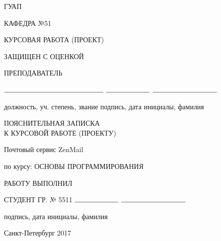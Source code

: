 \documentclass{article}
\begin{document}
    \begin{titlepage}
        \begin{center}
            ГУАП
            \vspace{0.25cm}

            КАФЕДРА №51
        \end{center}

        \begin{flushleft}

            КУРСОВАЯ РАБОТА (ПРОЕКТ)

            ЗАЩИЩЕН С ОЦЕНКОЙ

            ПРЕПОДАВАТЕЛЬ


            \vspace{0.5cm}

            $\rule{5cm}{0.15mm}$ \hfill $\rule{2.2cm}{0.15mm}$  \hfill $\rule{3.25cm}{0.15mm}$

            должность, уч. степень, звание \hfill подпись, дата \hfill инициалы, фамилия
        \end{flushleft}

		\vspace{2cm}

        \begin{center}
            ПОЯСНИТЕЛЬНАЯ ЗАПИСКА\\
			К КУРСОВОЙ РАБОТЕ (ПРОЕКТУ)


            \vspace{1cm}
			
			Почтовый сервис ZenMail

            \vspace{1cm}

            по курсу: ОСНОВЫ ПРОГРАММИРОВАНИЯ {\MakeUppercase{}}
        \end{center}

        \vspace{6cm}

        \begin{flushleft}
            РАБОТУ ВЫПОЛНИЛ

            СТУДЕНТ ГР. № 5511 \hfill $\rule{2.2cm}{0.15mm}$  \hfill $\rule{3.25cm}{0.15mm}$

            \hspace{7.8cm} подпись, дата \hfill инициалы, фамилия
        \end{flushleft}

        \vspace{5cm}
        \begin{center}
            Санкт-Петербург 2017
        \end{center}
    \end{titlepage}
    
\end{document}
